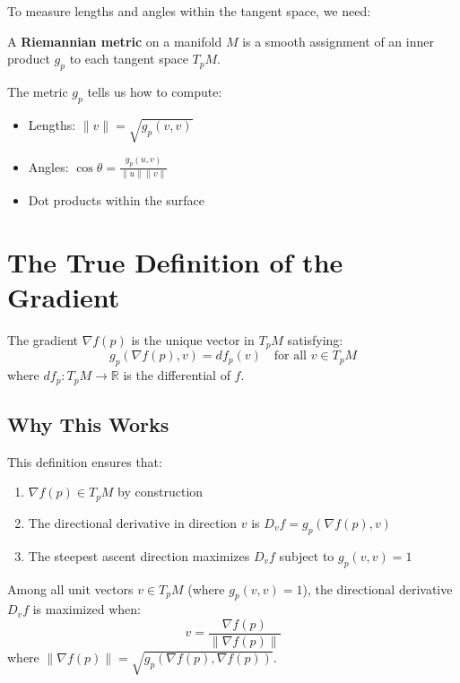 \begin{notechapter}
To measure lengths and angles within the tangent space, we need:

\begin{definition}
A \textbf{Riemannian metric} on a manifold $M$ is a smooth assignment of an inner product $g_p$ to each tangent space $T_p M$.
\end{definition}

The metric $g_p$ tells us how to compute:
\begin{itemize}
\item Lengths: $\|v\| = \sqrt{g_p(v,v)}$
\item Angles: $\cos\theta = \frac{g_p(u,v)}{\|u\|\|v\|}$
\item Dot products within the surface
\end{itemize}

\section{The True Definition of the Gradient}

\begin{definition}
The gradient $\nabla f(p)$ is the unique vector in $T_p M$ satisfying:
\[
g_p(\nabla f(p), v) = df_p(v) \quad \text{for all } v \in T_p M
\]
where $df_p: T_p M \to \mathbb{R}$ is the differential of $f$.
\end{definition}

\subsection{Why This Works}

This definition ensures that:

\begin{enumerate}
\item $\nabla f(p) \in T_p M$ by construction
\item The directional derivative in direction $v$ is $D_v f = g_p(\nabla f(p), v)$
\item The steepest ascent direction maximizes $D_v f$ subject to $g_p(v, v) = 1$
\end{enumerate}

\begin{theorem}
Among all unit vectors $v \in T_p M$ (where $g_p(v, v) = 1$), the directional derivative $D_v f$ is maximized when:
\[
v = \frac{\nabla f(p)}{\|\nabla f(p)\|}
\]
where $\|\nabla f(p)\| = \sqrt{g_p(\nabla f(p), \nabla f(p))}$.
\end{theorem}


\end{notechapter}

